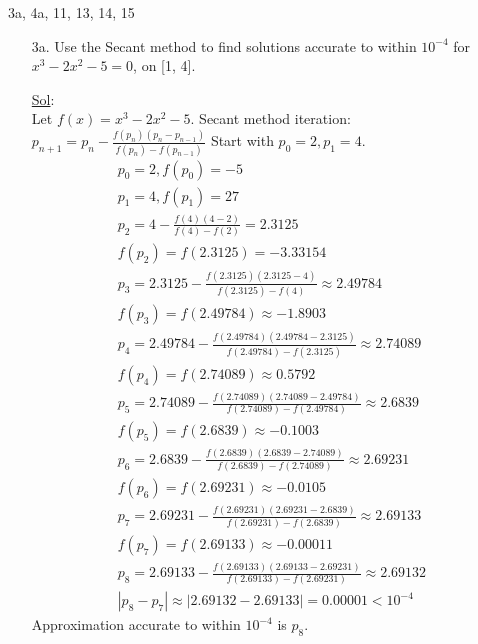 3a, 4a, 11, 13, 14, 15

\begin{enumerate}
  \item[3a.] Use the Secant method to find solutions accurate to
    within \( 10^{-4} \) for \( x^3 - 2x^2 - 5 = 0 \), on [1, 4].

    \underline{Sol}:\\
    Let \( f(x) = x^3 - 2x^2 - 5 \).
    Secant method iteration: \( p_{n+1} = p_n - \frac{f(p_n)(p_n -
    p_{n-1})}{f(p_n) - f(p_{n-1})} \)
    Start with \( p_0 = 2, p_1 = 4 \).
    \[
      \begin{array}{l}
        p_0 = 2, f(p_0) = -5 \\
        p_1 = 4, f(p_1) = 27 \\
        p_2 = 4 - \frac{f(4)(4-2)}{f(4) - f(2)} = 2.3125 \\
        f(p_2) = f(2.3125) = -3.33154 \\
        p_3 = 2.3125 - \frac{f(2.3125)(2.3125 - 4)}{f(2.3125) - f(4)}
        \approx 2.49784 \\
        f(p_3) = f(2.49784) \approx -1.8903 \\
        p_4 = 2.49784 - \frac{f(2.49784)(2.49784 -
        2.3125)}{f(2.49784) - f(2.3125)} \approx 2.74089 \\
        f(p_4) = f(2.74089) \approx 0.5792 \\
        p_5 = 2.74089 - \frac{f(2.74089)(2.74089 -
        2.49784)}{f(2.74089) - f(2.49784)} \approx 2.6839 \\
        f(p_5) = f(2.6839) \approx -0.1003 \\
        p_6 = 2.6839 - \frac{f(2.6839)(2.6839 - 2.74089)}{f(2.6839) -
        f(2.74089)} \approx 2.69231 \\
        f(p_6) = f(2.69231) \approx -0.0105 \\
        p_7 = 2.69231 - \frac{f(2.69231)(2.69231 -
        2.6839)}{f(2.69231) - f(2.6839)} \approx 2.69133 \\
        f(p_7) = f(2.69133) \approx -0.00011 \\
        p_8 = 2.69133 - \frac{f(2.69133)(2.69133 -
        2.69231)}{f(2.69133) - f(2.69231)} \approx 2.69132 \\
        |p_8 - p_7| \approx |2.69132 - 2.69133| = 0.00001 < 10^{-4}
      \end{array}
    \]
    Approximation accurate to within \( 10^{-4} \) is \( p_8 \).



\end{enumerate}
